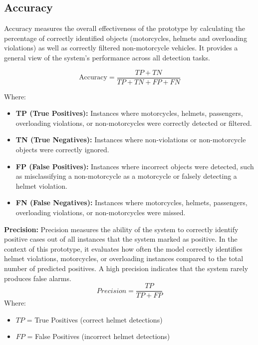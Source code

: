 \begin{refsection}
\section*{Accuracy}

Accuracy measures the overall effectiveness of the prototype by calculating the percentage of correctly identified objects (motorcycles, helmets and overloading violations) as well as correctly filtered non-motorcycle vehicles. It provides a general view of the system’s performance across all detection tasks.

\begin{equation}
    \text{Accuracy} = \frac{TP + TN}{TP + TN + FP + FN}
\end{equation}

Where:
\begin{itemize}
    \item \textbf{TP (True Positives):} Instances where motorcycles, helmets, passengers, overloading violations, or non-motorcycles were correctly detected or filtered.

    \item \textbf{TN (True Negatives):} Instances where non-violations or non-motorcycle objects were correctly ignored.

    \item \textbf{FP (False Positives):} Instances where incorrect objects were detected, such as misclassifying a non-motorcycle as a motorcycle or falsely detecting a helmet violation.

    \item \textbf{FN (False Negatives):} Instances where motorcycles, helmets, passengers, overloading violations, or non-motorcycles were missed.
\end{itemize}



    \item \textbf{Precision:}  Precision measures the ability of the system to correctly identify positive cases out of all instances that the system marked as positive. In the context of this prototype, it evaluates how often the model correctly identifies helmet violations, motorcycles, or overloading instances compared to the total number of predicted positives. A high precision indicates that the system rarely produces false alarms.
    \begin{equation}
        Precision = \frac{TP}{TP + FP}
        \label{eq:precision}
    \end{equation}
    Where:
    \begin{itemize}
        \item $TP$ = True Positives (correct helmet detections)
        \item $FP$ = False Positives (incorrect helmet detections)
    \end{itemize}



\end{refsection}
